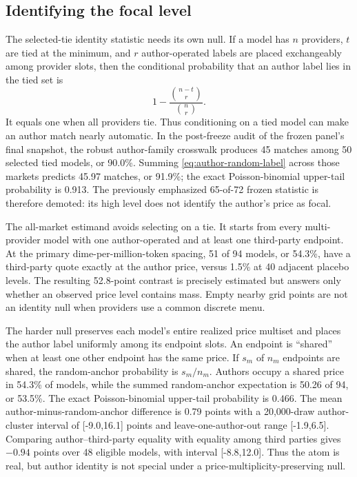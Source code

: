 \documentclass[11pt]{article}
\newcommand{\1}{\mathbf{1}}
\begin{document}
{\subsection{Identifying the focal level}

The selected-tie identity statistic needs its own null.  If a model has $n$
providers, $t$ are tied at the minimum, and $r$ author-operated labels are placed
exchangeably among provider slots, then the conditional probability that an
author label lies in the tied set is
\begin{equation}
  1-\frac{\binom{n-t}{r}}{\binom{n}{r}}.
  \label{eq:author-random-label}
\end{equation}
It equals one when all providers tie.  Thus conditioning on a tied model can make
an author match nearly automatic.  In the post-freeze audit of the frozen panel's
final snapshot, the robust author-family crosswalk produces 45 matches among 50
selected tied models,
or 90.0\%.  Summing \cref{eq:author-random-label} across those markets predicts
45.97 matches, or 91.9\%; the exact Poisson-binomial upper-tail probability is
0.913.  The previously emphasized 65-of-72 frozen statistic is therefore demoted:
its high level does not identify the author's price as focal.

The all-market estimand avoids selecting on a tie.  It starts from every
multi-provider model with one author-operated and at least one third-party
endpoint.  At the primary dime-per-million-token spacing, 51 of 94 models, or
54.3\%, have a third-party quote exactly at the author price, versus 1.5\% at 40
adjacent placebo levels.  The resulting 52.8-point contrast is precisely estimated
but answers only whether an observed price level contains mass.  Empty nearby
grid points are not an identity null when providers use a common discrete menu.

The harder null preserves each model's entire realized price multiset and places
the author label uniformly among its endpoint slots.  An endpoint is ``shared''
when at least one other endpoint has the same price.  If $s_m$ of $n_m$ endpoints
are shared, the random-anchor probability is $s_m/n_m$.  Authors occupy a shared
price in 54.3\% of models, while the summed random-anchor expectation is 50.26 of
94, or 53.5\%.  The exact Poisson-binomial upper-tail probability is $0.466$.
The mean author-minus-random-anchor difference is 0.79 points with a 20,000-draw
author-cluster interval of [-9.0,16.1] points and leave-one-author-out range
[-1.9,6.5].  Comparing author--third-party equality with equality among
third parties gives $-0.94$ points over 48 eligible models, with interval
[-8.8,12.0].  Thus the atom is real, but author identity is not special under a
price-multiplicity-preserving null.

}
\end{document}
